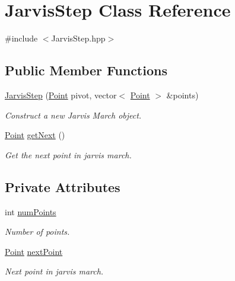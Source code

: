 \hypertarget{classJarvisStep}{}\section{Jarvis\+Step Class Reference}
\label{classJarvisStep}


{\ttfamily \#include $<$Jarvis\+Step.\+hpp$>$}

\subsection*{Public Member Functions}
\begin{DoxyCompactItemize}
\item 
\mbox{\hyperlink{classJarvisStep_afe702ba01d8077f819b82fa698d3a835}{Jarvis\+Step}} (\mbox{\hyperlink{classPoint}{Point}} pivot, vector$<$ \mbox{\hyperlink{classPoint}{Point}} $>$ \&points)
\begin{DoxyCompactList}\small\item\em Construct a new Jarvis March object. \end{DoxyCompactList}\item 
\mbox{\hyperlink{classPoint}{Point}} \mbox{\hyperlink{classJarvisStep_abe7e3817650fed66b7c5109839d355bc}{get\+Next}} ()
\begin{DoxyCompactList}\small\item\em Get the next point in jarvis march. \end{DoxyCompactList}\end{DoxyCompactItemize}
\subsection*{Private Attributes}
\begin{DoxyCompactItemize}
\item 
int \mbox{\hyperlink{classJarvisStep_a7616fe9780bd2285b3d01b8262d719bb}{num\+Points}}
\begin{DoxyCompactList}\small\item\em Number of points. \end{DoxyCompactList}\item 
\mbox{\hyperlink{classPoint}{Point}} \mbox{\hyperlink{classJarvisStep_a503a36c2f9fcd1bcb7a88b46849142fc}{next\+Point}}
\begin{DoxyCompactList}\small\item\em Next point in jarvis march. \end{DoxyCompactList}\end{DoxyCompactItemize}


